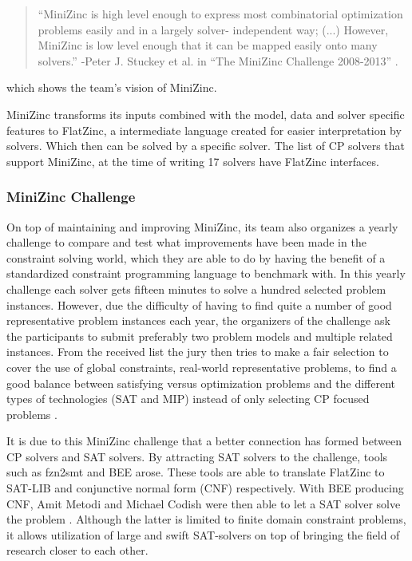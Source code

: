 \begin{quote}
	“MiniZinc is high level enough to express most combinatorial optimization problems easily and in a largely solver-
	independent way; (...) However, MiniZinc is low level enough that it can be mapped easily onto many solvers.” 
	\newline
	-Peter J. Stuckey et al. in “The MiniZinc Challenge 2008-2013” \cite{58stuckey2014minizinc}.
\end{quote} which shows the team’s vision of MiniZinc.

MiniZinc transforms its inputs combined with the model, data and solver specific features to FlatZinc, a intermediate language created for easier interpretation by solvers. Which then can be solved by a specific solver. The list of CP solvers that support MiniZinc, at the time of writing 17 solvers have FlatZinc interfaces.

\subsubsection{MiniZinc Challenge}
On top of maintaining and improving MiniZinc, its team also organizes a yearly challenge to compare and test what improvements have been made in the constraint solving world, which they are able to do by having the benefit of a standardized constraint programming language to benchmark with. 
In this yearly challenge each solver gets fifteen minutes to solve a hundred selected problem instances. However, due the difficulty of having to find quite a number of good representative problem instances each year, the organizers of the challenge ask the participants to submit preferably two problem models and multiple related instances. From the received list the jury then tries to make a fair selection to cover the use of global constraints, real-world representative problems, to find a good balance between satisfying versus optimization problems and the different types of technologies (SAT and MIP) instead of only selecting CP focused problems \cite{58stuckey2014minizinc}.

It is due to this MiniZinc challenge that a better connection has formed between CP solvers and SAT solvers. By attracting SAT solvers to the challenge, tools such as fzn2smt \cite{72bofill2010system} and BEE \cite{69BEEmetodi2012compiling} arose. These tools are able to translate FlatZinc to SAT-LIB and conjunctive normal form (CNF) respectively. 
With BEE producing CNF, Amit Metodi and Michael Codish were then able to let a SAT solver solve the problem \cite{69BEEmetodi2012compiling}. Although the latter is limited to finite domain constraint problems, it allows utilization of large and swift SAT-solvers on top of bringing the field of research closer to each other.

